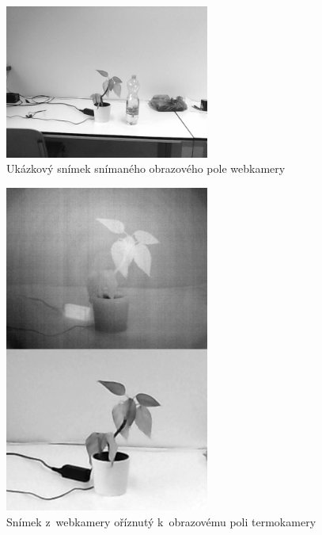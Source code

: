     \begin{figure}[h]
      \centering
      \includegraphics[width=0.6\textwidth]{images/webcam_sample.png}
      \caption{Ukázkový snímek snímaného obrazového pole webkamery}
      \label{fig:webcam_sample}
    \end{figure} 

    \begin{figure}[h]
      \centering
      \includegraphics[width=0.6\textwidth]{images/visible_cropped_to_thermal.png}
      \caption{Snímek z~webkamery oříznutý k~obrazovému poli termokamery}
      \label{fig:visible_cropped_to_thermal}
    \end{figure} 

